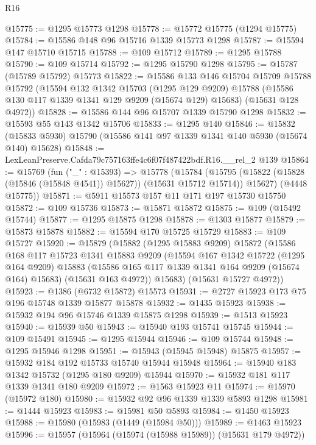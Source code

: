 \begin{lexlean}{R16}
\begin{coremodule}
@15775 := @1295 @15773 @1298
@15778 := @15772 @15775 (@1294 @15775)
@15784 := @15586 @148 @96 @15716 @1339 @15773 @1298
@15787 := @15594 @147 @15710 @15715
@15788 := @109 @15712
@15789 := @1295 @15788
@15790 := @109 @15714
@15792 := @1295 @15790 @1298
@15795 := @15787 (@15789 @15792) @15773
@15822 := @15586
    @133
    @146
    @15704
    @15709
    @15788
    @15792
    (@15594
      @132
      @1342
      @15703
      (@1295 @129 @9209)
      @15788
      (@15586 @130 @117 @1339 @1341 @129 @9209 (@15674 @129) @15683)
      (@15631 @128 @4972))
@15828 := @15586 @144 @96 @15707 @1339 @15790 @1298
@15832 := @15593 @55 @143 @1342 @15706
@15833 := @1295 @140
@15846 := @15832 (@15833 @5930) @15790 (@15586 @141 @97 @1339 @1341 @140 @5930 (@15674 @140) @15628)
@15848 := LexLeanPreserve.Cafda79c757163ffe4c6f07f487422bdf.R16.__rel_2 @139
@15864 := @15769
    (fun ("_" : @15393) =>
    @15778
      (@15784
        (@15795 (@15822 (@15828 (@15846 (@15848 @4541)) @15627)) (@15631 @15712 @15714))
        @15627)
      (@4448 @15775))
@15871 := @5911 @15573 @157 @11 @171 @197 @15730 @15750
@15872 := @109 @15736
@15873 := @15871 @15872
@15875 := @109 (@15492 @15744)
@15877 := @1295 @15875 @1298
@15878 := @1303 @15877
@15879 := @15873 @15878
@15882 := @15594 @170 @15725 @15729
@15883 := @109 @15727
@15920 := @15879
    (@15882
      (@1295 @15883 @9209)
      @15872
      (@15586
        @168
        @117
        @15723
        @1341
        @15883
        @9209
        (@15594
          @167
          @1342
          @15722
          (@1295 @164 @9209)
          @15883
          (@15586 @165 @117 @1339 @1341 @164 @9209 (@15674 @164) @15683)
          (@15631 @163 @4972))
        @15683)
      (@15631 @15727 @4972))
@15923 := @1386 (@6732 @15872) @15573
@15931 := @2727 @15923 @173 @75 @196 @15748 @1339 @15877 @15878
@15932 := @1435 @15923
@15938 := @15932 @194 @96 @15746 @1339 @15875 @1298
@15939 := @1513 @15923
@15940 := @15939 @50
@15943 := @15940 @193 @15741 @15745
@15944 := @109 @15491
@15945 := @1295 @15944
@15946 := @109 @15744
@15948 := @1295 @15946 @1298
@15951 := @15943 (@15945 @15948) @15875
@15957 := @15932 @184 @192 @15733 @15740 @15944 @15948
@15964 := @15940 @183 @1342 @15732 (@1295 @180 @9209) @15944
@15970 := @15932 @181 @117 @1339 @1341 @180 @9209
@15972 := @1563 @15923 @11
@15974 := @15970 (@15972 @180)
@15980 := @15932 @92 @96 @1339 @1339 @5893 @1298
@15981 := @1444 @15923
@15983 := @15981 @50 @5893
@15984 := @1450 @15923
@15988 := @15980 (@15983 (@1449 (@15984 @50)))
@15989 := @1463 @15923
@15996 := @15957 (@15964 (@15974 (@15988 @15989)) (@15631 @179 @4972))

\end{coremodule}
\end{lexlean}
